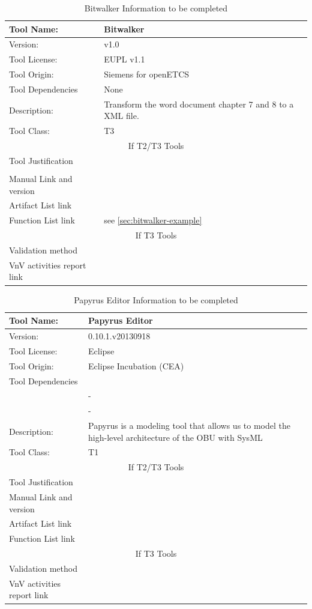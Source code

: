 \begin{table}[htbp]
\centering
\caption{\label{tbl:bitwalker-info}Bitwalker Information to be completed}
\begin{tabular}{|l|p{5cm}|}\hline
Tool Name: & Bitwalker \\\hline
Version: & v1.0\\\hline
Tool License: & EUPL v1.1 \\\hline
Tool Origin: & Siemens for openETCS\\\hline
Tool Dependencies & None\\ \hline
Description: & Transform the word document chapter 7 and 8 to a XML file. \\ \hline
Tool Class: & T3 \\\hline
\multicolumn{2}{|c|}{If T2/T3 Tools}\\\hline
Tool Justification & \\
 & \\ \hline
Manual Link and version & \\\hline
Artifact List link & \\\hline
Function List link& see \ref{sec:bitwalker-example} \\\hline
\multicolumn{2}{|c|}{If T3 Tools}\\\hline
Validation method& \\\hline
VnV activities report link&\\\hline
\end{tabular}
\end{table}

\begin{table}[htbp]
\centering
\caption{\label{tbl:papyrus-info} Papyrus Editor Information to be completed}
\begin{tabular}{|l|p{5cm}|}\hline
Tool Name: & Papyrus Editor \\\hline
Version: &  0.10.1.v20130918 \\\hline
Tool License: & Eclipse \\\hline
Tool Origin: &  Eclipse Incubation (CEA)\\\hline
Tool Dependencies & \\
 & -\\
 & -\\ \hline
Description: & Papyrus is a modeling tool that allows us
    to model the high-level architecture of the OBU with SysML  \\ \hline
Tool Class: & T1\\\hline
\multicolumn{2}{|c|}{If T2/T3 Tools}\\\hline
Tool Justification &\\ \hline
Manual Link and version & \\\hline
Artifact List link & \\\hline
Function List link& \\\hline
\multicolumn{2}{|c|}{If T3 Tools}\\\hline
Validation method& \\\hline
VnV activities report link&\\\hline
\end{tabular}
\end{table}

